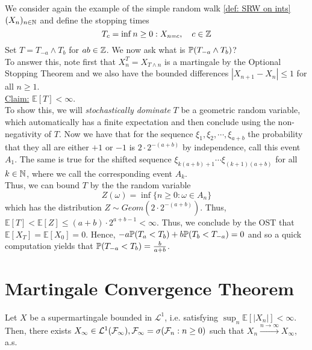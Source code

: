 \documentclass{article}
\begin{document}
 We consider again the example of the simple random walk \ref{def: SRW on ints} $ (X_{n})_{n\in \mathbb{N}}$ and define the stopping times 
\[
	T_{c} = \displaystyle\inf {n\geq 0: X_{n = c}}, \quad c\in \mathbb{Z}
\]
Set $ T = T_{-a}\land T_{b}$ for $ a b \in \mathbb{Z}$. We now ask what is $ \mathbb{P}(T_{-a}\land T_{b})$?\\ 

To answer this, note first that $ X^{T}_{n} = X_{T\land n}$ is a martingale by the Optional Stopping Theorem and we also have the bounded differences $ |X_{n+1}-X_{n}|\leq 1$ for all $ n\geq 1$.\\ 

\underline{Claim:} $\mathbb{E}[T]<\infty$.\\ 
To show this, we will \textit{stochastically dominate} $ T$ be a geometric random variable, which automatically has a finite expectation and then conclude using the non-negativity of $ T$. Now we have that for the sequence $ \xi_{1}, \xi_{2}, \cdots, \xi_{a+b}$ the probability that they all are either $ +1$ or $ -1$ is $ 2\cdot 2^{-(a+b)}$ by independence, call this event $ A_1$. The same is true for the shifted sequence $ \xi_{k(a+b)+1}\cdots \xi_{(k+1)(a+b)}$ for all $ k\in \mathbb{N}$, where we call the corresponding event $ A_{k}$.  \\ 

Thus, we can bound $ T$ by the the random variable
\[
	Z(\omega) =\displaystyle\inf\{n\geq 0: \omega \in A_{n}\}  
\]
which has the distribution $ Z\sim Geom(2\cdot2^{-(a+b)})$. Thus, $\mathbb{E}[T]<\mathbb{E}[Z]\leq (a+b)\cdot 2^{a+b-1}<\infty$. Thus, we conclude by the OST that $\mathbb{E}[X_{T}]=\mathbb{E}[X_{0}]=0$. Hence, $ -a\mathbb{P}(T_{a}<T_{b})+b\mathbb{P}(T_{b}<T_{-a}) = 0$ and so a quick computation yields that $ \mathbb{P}(T_{-a}<T_{b}) = \frac{b}{a+b}$.\\ 

\section{Martingale Convergence Theorem}\label{sec: mg conv thm discrete case}

\begin{theorem}\label{thm: a.s. mg conv thm disc}
	Let $ X$ be a supermartingale bounded in $ \mathcal{L}^{1}$, i.e. satisfying $\displaystyle \sup_{n}\mathbb{E}[|X_{n}|]<\infty$. Then, there exists $ X_{\infty}\in \mathcal{ L}^{1}(\mathcal{F}_{\infty}), \mathcal{F}_{\infty} = \sigma(\mathcal{F}_{n}: n\geq 0)$ such that $ X_{n}\stackrel{n\to \infty}{\longrightarrow} X_{\infty}$, a.s.
\end{theorem}
\end{document}
